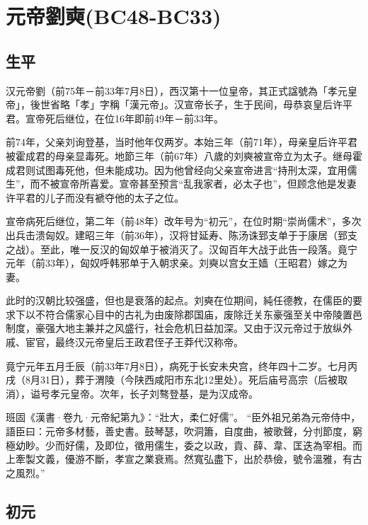 
\section{元帝劉奭\tiny(BC48-BC33)}

\subsection{生平}

汉元帝劉（前75年－前33年7月8日），西汉第十一位皇帝，其正式諡號為「孝元皇帝」，後世省略「孝」字稱「漢元帝」。汉宣帝长子，生于民间，母恭哀皇后许平君。宣帝死后继位，在位16年即前49年－前33年。

前74年，父亲刘询登基，当时他年仅两岁。本始三年（前71年），母亲皇后许平君被霍成君的母亲显毒死。地節三年（前67年）八歲的刘奭被宣帝立为太子。继母霍成君则试图毒死他，但未能成功。因为他曾经向父亲宣帝进言“持刑太深，宜用儒生”，而不被宣帝所喜爱。宣帝甚至预言“乱我家者，必太子也”，但顾念他是发妻许平君的儿子而没有褫夺他的太子之位。

宣帝病死后继位，第二年（前48年）改年号为“初元”，在位时期“崇尚儒术”，多次出兵击溃匈奴。建昭三年（前36年），汉将甘延寿、陈汤诛郅支单于于康居（郅支之战）。至此，唯一反汉的匈奴单于被消灭了。汉匈百年大战于此告一段落。竟宁元年（前33年），匈奴呼韩邪单于入朝求亲。刘奭以宫女王嫱（王昭君）嫁之为妻。

此时的汉朝比较强盛，但也是衰落的起点。刘奭在位期间，純任德教，在儒臣的要求下以不符合儒家心目中的古礼为由废除郡国庙，废除迁关东豪强至关中帝陵置邑制度，豪强大地主兼并之风盛行，社会危机日益加深。又由于汉元帝过于放纵外戚、宦官，最终汉元帝皇后王政君侄子王莽代汉称帝。

竟宁元年五月壬辰（前33年7月8日），病死于长安未央宫，终年四十二岁。七月丙戌（8月31日），葬于渭陵（今陕西咸阳市东北12里处）。死后庙号高宗（后被取消），谥号孝元皇帝。次年，长子刘骜登基，是为汉成帝。

班固《漢書·卷九·元帝紀第九》：“壯大，柔仁好儒”。 “臣外祖兄弟為元帝侍中，語臣曰：元帝多材藝，善史書。鼓琴瑟，吹洞簫，自度曲，被歌聲，分刌節度，窮極幼眇。少而好儒，及即位，徵用儒生，委之以政，貢、薛、韋、匡迭為宰相。而上牽製文義，優游不斷，孝宣之業衰焉。然寬弘盡下，出於恭儉，號令溫雅，有古之風烈。”

\subsection{初元}

